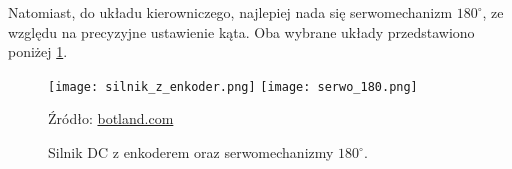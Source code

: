             Natomiast, do układu kierowniczego, najlepiej nada się serwomechanizm $180^\circ$, ze względu na precyzyjne ustawienie kąta. Oba wybrane układy przedstawiono poniżej \ref{fig:engines}.
            \begin{figure}[!ht]
                \centering
                \texttt{[image: silnik\_z\_enkoder.png]}
                \texttt{[image: serwo\_180.png]}

                \caption{Silnik DC z enkoderem oraz serwomechanizmy $180^\circ$.}
                \footnotesize{Źródło: \href{https://botland.com.pl/}{botland.com}}
                \label{fig:engines}
            \end{figure}

